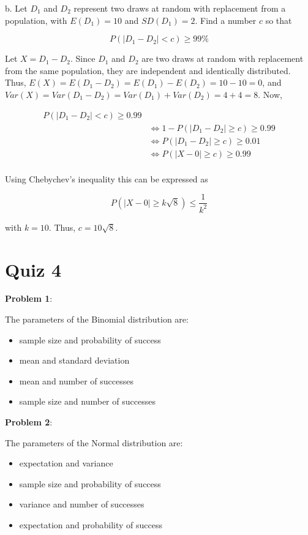 \documentclass{article}
\begin{document}
\indent\indent b. Let $D_1$ and $D_2$ represent two draws at random with replacement from a population, with $E(D_1)=10$ and $SD(D_1)=2$. Find a number $c$ so that

$$P(|D_1-D_2|<c)\ge99\%$$

{\color{blue}

Let $X=D_1-D_2$. Since $D_1$ and $D_2$ are two draws at random with replacement from the same population, they are independent and identically distributed. Thus, $E(X)=E(D_1-D_2)=E(D_1)-E(D_2)=10-10=0$, and $Var(X)=Var(D_1-D_2)=Var(D_1)+Var(D_2)=4+4=8$. Now,

\begin{align*}
    P(|D_1-D_2|<c)\ge0.99&\\
    &\Leftrightarrow1-P(|D_1-D_2|\ge c)\ge0.99\\
    &\Leftrightarrow P(|D_1-D_2|\ge c)\ge0.01\\
    &\Leftrightarrow P(|X-0|\ge c)\ge0.99\\
\end{align*}

Using Chebychev's inequality this can be expressed as

$$P(|X-0|\ge k\sqrt{8})\le\frac{1}{k^2}$$

with $k=10$. Thus, $c=10\sqrt{8}$.

}

\section{Quiz 4}

\noindent\textbf{Problem 1}:

The parameters of the Binomial distribution are:

\begin{itemize}
    \item {\color{blue}sample size and probability of success}
    \item mean and standard deviation
    \item mean and number of successes
    \item sample size and number of successes
\end{itemize}

\noindent\textbf{Problem 2}:

The parameters of the Normal distribution are:

\begin{itemize}
    \item {\color{blue}expectation and variance}
    \item sample size and probability of success
    \item variance and number of successes
    \item expectation and probability of success
\end{itemize}
\end{document}
